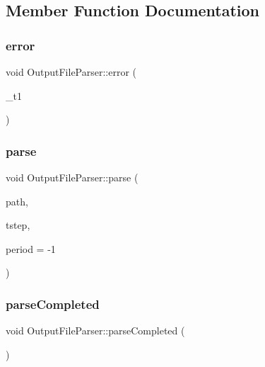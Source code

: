 \subsection{Member Function Documentation}
\mbox{\label{class_output_file_parser_a947aea98f88da9fefba1fdeb71a1b57b}} 
\subsubsection{\texorpdfstring{error}{error}}
{\footnotesize\ttfamily void Output\+File\+Parser\+::error (\begin{DoxyParamCaption}\item[{Q\+String}]{\+\_\+t1 }\end{DoxyParamCaption})\hspace{0.3cm}{\ttfamily [signal]}}

\mbox{\label{class_output_file_parser_add4bf39a2cd885b36495c9a3a1b109ba}} 
\subsubsection{\texorpdfstring{parse}{parse}}
{\footnotesize\ttfamily void Output\+File\+Parser\+::parse (\begin{DoxyParamCaption}\item[{Q\+String}]{path,  }\item[{int}]{tstep,  }\item[{int}]{period = {\ttfamily -\/1} }\end{DoxyParamCaption})\hspace{0.3cm}{\ttfamily [slot]}}

\mbox{\label{class_output_file_parser_afad47e50fb7d679046877805e5516a04}} 
\subsubsection{\texorpdfstring{parseCompleted}{parseCompleted}}
{\footnotesize\ttfamily void Output\+File\+Parser\+::parse\+Completed (\begin{DoxyParamCaption}{ }\end{DoxyParamCaption})\hspace{0.3cm}{\ttfamily [signal]}}

